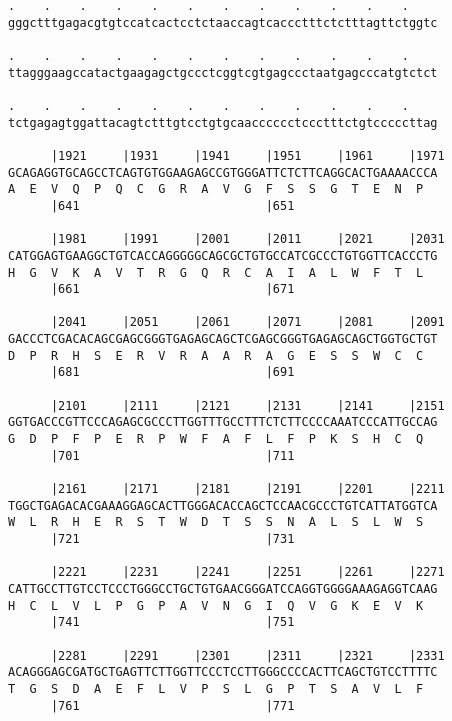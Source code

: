 \documentclass{article}
\begin{document}
\begin{Verbatim}
.    .    .    .    .    .    .    .    .    .    .    .    
gggctttgagacgtgtccatcactcctctaaccagtcaccctttctctttagttctggtc
                                                            
.    .    .    .    .    .    .    .    .    .    .    .    
ttagggaagccatactgaagagctgccctcggtcgtgagccctaatgagcccatgtctct
                                                            
.    .    .    .    .    .    .    .    .    .    .    .    
tctgagagtggattacagtctttgtcctgtgcaacccccctccctttctgtcccccttag
                                                            
      |1921     |1931     |1941     |1951     |1961     |1971
GCAGAGGTGCAGCCTCAGTGTGGAAGAGCCGTGGGATTCTCTTCAGGCACTGAAAACCCA
A  E  V  Q  P  Q  C  G  R  A  V  G  F  S  S  G  T  E  N  P  
      |641                          |651                    
  
      |1981     |1991     |2001     |2011     |2021     |2031
CATGGAGTGAAGGCTGTCACCAGGGGGCAGCGCTGTGCCATCGCCCTGTGGTTCACCCTG
H  G  V  K  A  V  T  R  G  Q  R  C  A  I  A  L  W  F  T  L  
      |661                          |671                    
  
      |2041     |2051     |2061     |2071     |2081     |2091
GACCCTCGACACAGCGAGCGGGTGAGAGCAGCTCGAGCGGGTGAGAGCAGCTGGTGCTGT
D  P  R  H  S  E  R  V  R  A  A  R  A  G  E  S  S  W  C  C  
      |681                          |691                    
  
      |2101     |2111     |2121     |2131     |2141     |2151
GGTGACCCGTTCCCAGAGCGCCCTTGGTTTGCCTTTCTCTTCCCCAAATCCCATTGCCAG
G  D  P  F  P  E  R  P  W  F  A  F  L  F  P  K  S  H  C  Q  
      |701                          |711                    
  
      |2161     |2171     |2181     |2191     |2201     |2211
TGGCTGAGACACGAAAGGAGCACTTGGGACACCAGCTCCAACGCCCTGTCATTATGGTCA
W  L  R  H  E  R  S  T  W  D  T  S  S  N  A  L  S  L  W  S  
      |721                          |731                    
  
      |2221     |2231     |2241     |2251     |2261     |2271
CATTGCCTTGTCCTCCCTGGGCCTGCTGTGAACGGGATCCAGGTGGGGAAAGAGGTCAAG
H  C  L  V  L  P  G  P  A  V  N  G  I  Q  V  G  K  E  V  K  
      |741                          |751                    
  
      |2281     |2291     |2301     |2311     |2321     |2331
ACAGGGAGCGATGCTGAGTTCTTGGTTCCCTCCTTGGGCCCCACTTCAGCTGTCCTTTTC
T  G  S  D  A  E  F  L  V  P  S  L  G  P  T  S  A  V  L  F  
      |761                          |771                    
  

\end{Verbatim}
\end{document}
